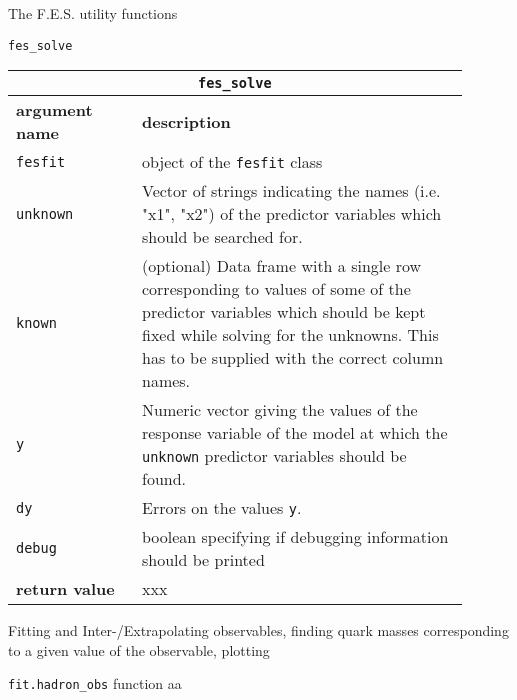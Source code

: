 \documentclass[10pt,a4paper]{article}
\begin{document}
\begin{section}{The F.E.S. utility functions}
\begin{subsection}{ {\tt fes\_solve} }
{ \centering
\begin{tabular}{|p{0.25\linewidth}|p{0.65\linewidth}|}
\hline
\multicolumn{2}{|c|}{ {\tt fes\_solve} } \\
\hline \hline \textbf{argument name} & \textbf{description} \\
\hline {\tt fesfit} & object of the {\tt fesfit} class \\ 
{\tt unknown} & Vector of strings indicating the names (i.e. "x1", "x2") of the
predictor variables which should be searched for. \\ 
{\tt known} & (optional) Data frame with a single row corresponding to values of
some of the predictor variables which should be kept fixed while solving for the
unknowns. This has to be supplied with the correct column names. \\ 
{\tt y} & Numeric vector giving the values of the response variable of the model
at which the {\tt unknown} predictor variables should be found. \\
{\tt dy} & Errors on the values {\tt y}. \\
{\tt debug} & boolean specifying if debugging information should be printed \\
\hline \hline
\textbf{return value} & xxx \\
\hline
\end{tabular}
} %

\end{subsection}

\end{section} 


\begin{section}{Fitting and Inter-/Extrapolating observables, finding quark
masses corresponding to a given value of the observable, plotting}

\begin{subsection}{{\tt fit.hadron\_obs} function}
aa
\end{subsection}

\end{section} %
\end{document}
